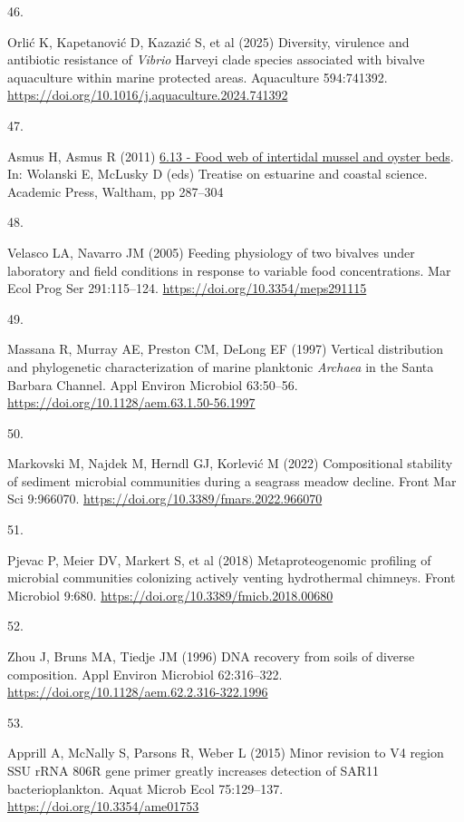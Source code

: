 \documentclass[
  12 pt,
]{article}
\newlength{\cslhangindent}
\newlength{\csllabelwidth}
\newenvironment{CSLReferences}[2] %
 {\begin{list}{}{%
  \setlength{\itemindent}{0pt}
  \setlength{\leftmargin}{0pt}
  \setlength{\parsep}{0pt}
  \ifodd #1
   \setlength{\leftmargin}{\cslhangindent}
   \setlength{\itemindent}{-1\cslhangindent}
  \fi
  \setlength{\itemsep}{#2\baselineskip}}}
 {\end{list}}
\newcommand{\CSLLeftMargin}[1]{\parbox[t]{\csllabelwidth}{\strut#1\strut}}
\newcommand{\CSLRightInline}[1]{\parbox[t]{\linewidth - \csllabelwidth}{\strut#1\strut}}
\begin{document}
\begin{CSLReferences}{0}{0}
\CSLLeftMargin{46. }%
\CSLRightInline{Orlić K, Kapetanović D, Kazazić S, et al (2025) Diversity, virulence and antibiotic resistance of {{\emph{Vibrio}}} {Harveyi} clade species associated with bivalve aquaculture within marine protected areas. Aquaculture 594:741392. \url{https://doi.org/10.1016/j.aquaculture.2024.741392}}

\CSLLeftMargin{47. }%
\CSLRightInline{Asmus H, Asmus R (2011) \href{https://doi.org/10.1016/B978-0-12-374711-2.00627-6}{6.13 - Food web of intertidal mussel and oyster beds}. In: Wolanski E, McLusky D (eds) Treatise on estuarine and coastal science. Academic Press, Waltham, pp 287--304}

\CSLLeftMargin{48. }%
\CSLRightInline{Velasco LA, Navarro JM (2005) Feeding physiology of two bivalves under laboratory and field conditions in response to variable food concentrations. Mar Ecol Prog Ser 291:115--124. \url{https://doi.org/10.3354/meps291115}}

\CSLLeftMargin{49. }%
\CSLRightInline{Massana R, Murray AE, Preston CM, DeLong EF (1997) Vertical distribution and phylogenetic characterization of marine planktonic {{\emph{Archaea}}} in the {Santa Barbara Channel}. Appl Environ Microbiol 63:50--56. \url{https://doi.org/10.1128/aem.63.1.50-56.1997}}

\CSLLeftMargin{50. }%
\CSLRightInline{Markovski M, Najdek M, Herndl GJ, Korlević M (2022) Compositional stability of sediment microbial communities during a seagrass meadow decline. Front Mar Sci 9:966070. \url{https://doi.org/10.3389/fmars.2022.966070}}

\CSLLeftMargin{51. }%
\CSLRightInline{Pjevac P, Meier DV, Markert S, et al (2018) Metaproteogenomic profiling of microbial communities colonizing actively venting hydrothermal chimneys. Front Microbiol 9:680. \url{https://doi.org/10.3389/fmicb.2018.00680}}

\CSLLeftMargin{52. }%
\CSLRightInline{Zhou J, Bruns MA, Tiedje JM (1996) {DNA} recovery from soils of diverse composition. Appl Environ Microbiol 62:316--322. \url{https://doi.org/10.1128/aem.62.2.316-322.1996}}

\CSLLeftMargin{53. }%
\CSLRightInline{Apprill A, McNally S, Parsons R, Weber L (2015) Minor revision to {V4} region {SSU rRNA 806R} gene primer greatly increases detection of {SAR11} bacterioplankton. Aquat Microb Ecol 75:129--137. \url{https://doi.org/10.3354/ame01753}}


\end{CSLReferences}
\end{document}
